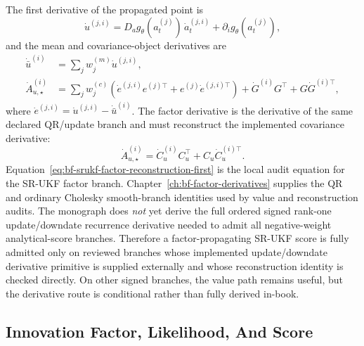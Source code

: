 The first derivative of the propagated point is
\begin{equation}
\label{eq:bf-srukf-propagated-point-first}
  \dot u^{(j,i)}
  =
  D_a g_\theta(a_t^{(j)})\,\dot a_t^{(j,i)}
  +\partial_i g_\theta(a_t^{(j)}),
\end{equation}
and the mean and covariance-object derivatives are
\begin{align}
\label{eq:bf-srukf-moment-mean-first}
  \dot{\bar u}^{(i)}
  &=
  \sum_j w_j^{(m)}\dot u^{(j,i)},\\
\label{eq:bf-srukf-moment-covariance-first}
  \dot A_{u,\star}^{(i)}
  &=
  \sum_j w_j^{(c)}
  \left(
    \dot e^{(j,i)}e^{(j)\top}
    +e^{(j)}\dot e^{(j,i)\top}
  \right)
  +\dot G^{(i)}G^\top+G\dot G^{(i)\top},
\end{align}
where \(\dot e^{(j,i)}=\dot u^{(j,i)}-\dot{\bar u}^{(i)}\).  The factor
derivative is the derivative of the same declared QR/update branch and must
reconstruct the implemented covariance derivative:
\begin{equation}
\label{eq:bf-srukf-factor-reconstruction-first}
  \dot A_{u,\star}^{(i)}
  =
  \dot C_u^{(i)}C_u^\top+C_u\dot C_u^{(i)\top}.
\end{equation}
Equation~\eqref{eq:bf-srukf-factor-reconstruction-first} is the local audit
equation for the SR-UKF factor branch.  Chapter~\ref{ch:bf-factor-derivatives}
supplies the QR and ordinary Cholesky smooth-branch identities used by value and
reconstruction audits.  The monograph does \emph{not} yet derive the full
ordered signed rank-one update/downdate recurrence derivative needed to admit
all negative-weight analytical-score branches.  Therefore a factor-propagating
SR-UKF score is fully admitted only on reviewed branches whose implemented
update/downdate derivative primitive is supplied externally and whose
reconstruction identity is checked directly.  On other signed branches, the
value path remains useful, but the derivative route is conditional rather than
fully derived in-book.

\subsection{Innovation Factor, Likelihood, And Score}
\label{sec:bf-srukf-innovation-score}

